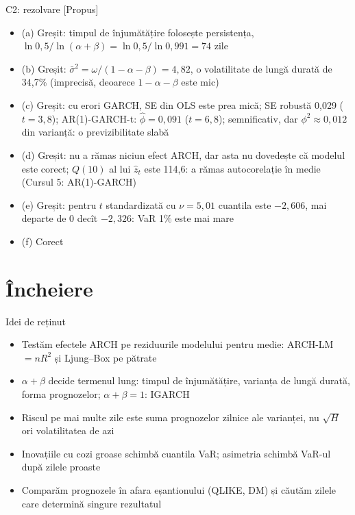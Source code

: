 \ifsolutions
\begin{frame}{C2: rezolvare [Propus]}
\itemsize{\footnotesize}
\begin{itemize}
    \item (a) Greșit: timpul de înjumătățire folosește persistența, $\ln 0{,}5/\ln(\alpha + \beta) = \ln 0{,}5/\ln 0{,}991 = 74$ zile
    \item (b) Greșit: $\bar\sigma^2 = \omega/(1 - \alpha - \beta) = 4{,}82$, o volatilitate de lungă durată de 34{,}7\% (imprecisă, deoarece $1 - \alpha - \beta$ este mic)
    \item (c) Greșit: cu erori GARCH, SE din OLS este prea mică; SE robustă 0{,}029 ($t = 3{,}8$); AR(1)-GARCH-t: $\hat\phi = 0{,}091$ ($t = 6{,}8$); semnificativ, dar $\phi^2 \approx 0{,}012$ din varianță: o previzibilitate slabă
    \item (d) Greșit: nu a rămas niciun efect ARCH, dar asta nu dovedește că modelul este corect; $Q(10)$ al lui $\hat z_t$ este 114{,}6: a rămas autocorelație în medie (Cursul 5: AR(1)-GARCH)
    \item (e) Greșit: pentru $t$ standardizată cu $\nu = 5{,}01$ cuantila este $-2{,}606$, mai departe de 0 decît $-2{,}326$: VaR 1\% este mai mare
    \item (f) Corect
\end{itemize}
\end{frame}
\fi


\section{Încheiere}

\begin{frame}{Idei de reținut}
\itemsize{\small}
\begin{itemize}
    \item Testăm efectele ARCH pe reziduurile modelului pentru medie: ARCH-LM $= nR^2$ și Ljung--Box pe pătrate
    \item $\alpha + \beta$ decide termenul lung: timpul de înjumătățire, varianța de lungă durată, forma prognozelor; $\alpha + \beta = 1$: IGARCH
    \item Riscul pe mai multe zile este suma prognozelor zilnice ale varianței, nu $\sqrt{H}$ ori volatilitatea de azi
    \item Inovațiile cu cozi groase schimbă cuantila VaR; asimetria schimbă VaR-ul după zilele proaste
    \item Comparăm prognozele în afara eșantionului (QLIKE, DM) și căutăm zilele care determină singure rezultatul
\end{itemize}
\end{frame}

